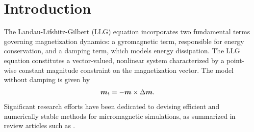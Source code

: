 \documentclass[preprint,times,3p]{elsarticle}
\def\m{\mbox{\boldmath $m$}}
\begin{document}
\section{Introduction}


The Landau-Lifshitz-Gilbert (LLG) equation \cite{Landau1935On,Gilbert:1955} incorporates two fundamental terms governing magnetization dynamics: a gyromagnetic term, responsible for energy conservation, and a damping term, which models energy dissipation. 
The LLG equation constitutes a vector-valued, nonlinear system characterized by a point-wise constant magnitude constraint on the magnetization vector. The model without damping is given by
\begin{align*}
    \m_t=-\m\times \Delta \m.
\end{align*}
Significant research efforts have been dedicated to devising efficient and numerically stable methods for micromagnetic simulations, as summarized in review articles such as \cite{kruzik2006recent,cimrak2007survey}. 
\end{document}
